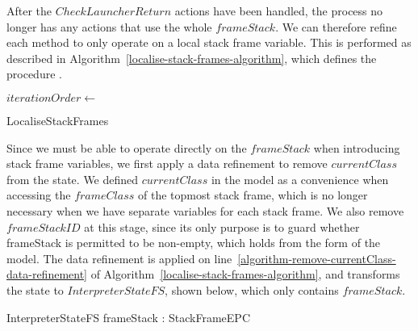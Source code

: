After the $CheckLauncherReturn$ actions have been handled, the process
no longer has any actions that use the whole $frameStack$.
We can therefore refine each method to only operate on a local stack
frame variable.
This is performed as described in
Algorithm~\ref{localise-stack-frames-algorithm}, which defines the
procedure .

\begin{algorithm}
  \begin{algorithmic}[1]
    \State {}
    \label{algorithm-remove-currentClass-data-refinement}
    \State $iterationOrder \gets$ 
    \label{algorithm-method-dependency-order-call}
    \label{algorithm-localise-stack-frames-loop}
    \State {}
    \label{algorithm-localise-stack-frames-copy-in}
    \State {}
    \EndFor
  \end{algorithmic}
  \caption{LocaliseStackFrames}
  \label{localise-stack-frames-algorithm}
\end{algorithm}

Since we must be able to operate directly on the $frameStack$ when
introducing stack frame variables, we first apply a data refinement to
remove $currentClass$ from the state.
We defined $currentClass$ in the model as a convenience when accessing
the $frameClass$ of the topmost stack frame, which is no longer
necessary when we have separate variables for each stack frame.
We also remove $frameStackID$ at this stage, since its only purpose is
to guard whether frameStack is permitted to be non-empty, which holds
from the form of the model.
The data refinement is applied on
line~\ref{algorithm-remove-currentClass-data-refinement} of
Algorithm~\ref{localise-stack-frames-algorithm}, and transforms the
state to $InterpreterStateFS$, shown below, which only contains
$frameStack$.
\begin{schema}{InterpreterStateFS}
  frameStack : StackFrameEPC
\end{schema}

